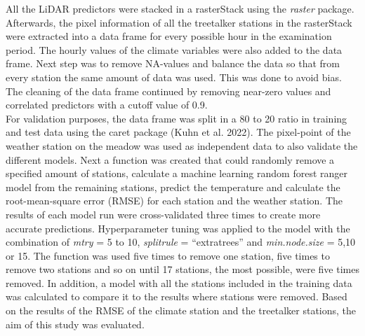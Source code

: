 \documentclass[5p]{elsarticle} %
\begin{document}
All the LiDAR predictors were stacked in a rasterStack using the \emph{raster} package. Afterwards, the pixel information of all the treetalker stations in the rasterStack were extracted into a data frame for every possible hour in the examination period. The hourly values of the climate variables were also added to the data frame. Next step was to remove NA-values and balance the data so that from every station the same amount of data was used. This was done to avoid bias. The cleaning of the data frame continued by removing near-zero values and correlated predictors with a cutoff value of 0.9. \\
For validation purposes, the data frame was split in a 80 to 20 ratio in training and test data using the caret package (Kuhn et al. 2022). The pixel-point of the weather station on the meadow was used as independent data to also validate the different models. Next a function was created that could randomly remove a specified amount of stations, calculate a machine learning random forest ranger model from the remaining stations, predict the temperature and calculate the root-mean-square error (RMSE) for each station and the weather station. The results of each model run were cross-validated three times to create more accurate predictions. Hyperparameter tuning was applied to the model with the combination of \emph{mtry} = 5 to 10, \emph{splitrule} = “extratrees” and \emph{min.node.size} = 5,10 or 15. The function was used five times to remove one station, five times to remove two stations and so on until 17 stations, the most possible, were five times removed. In addition, a model with all the stations included in the training data was calculated to compare it to the results where stations were removed. Based on the results of the RMSE of the climate station and the treetalker stations, the aim of this study was evaluated. 
\end{document}
